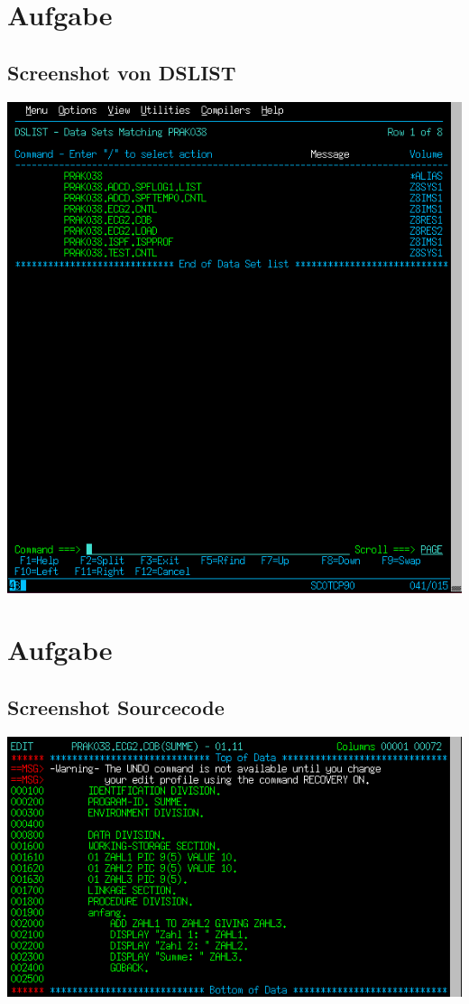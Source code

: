 \documentclass[a4paper]{scrartcl}
\begin{document}
	\section{Aufgabe}
	\subsection{Screenshot von DSLIST}
	\includegraphics{screenshots/1_DSLIST.png}
	\section{Aufgabe}
	\subsection{Screenshot Sourcecode}
	\includegraphics{screenshots/2_cobol_code.png}
	
\end{document}
